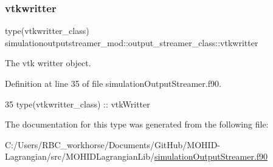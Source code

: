 \subsubsection{\texorpdfstring{vtkwritter}{vtkwritter}}
{\footnotesize\ttfamily type(vtkwritter\+\_\+class) simulationoutputstreamer\+\_\+mod\+::output\+\_\+streamer\+\_\+class\+::vtkwritter\hspace{0.3cm}{\ttfamily [private]}}



The vtk writter object. 



Definition at line 35 of file simulation\+Output\+Streamer.\+f90.


\begin{DoxyCode}
35         \textcolor{keywordtype}{type}(vtkwritter\_class) :: vtkWritter
\end{DoxyCode}


The documentation for this type was generated from the following file\+:\begin{DoxyCompactItemize}
\item 
C\+:/\+Users/\+R\+B\+C\+\_\+workhorse/\+Documents/\+Git\+Hub/\+M\+O\+H\+I\+D-\/\+Lagrangian/src/\+M\+O\+H\+I\+D\+Lagrangian\+Lib/\mbox{\hyperlink{simulation_output_streamer_8f90}{simulation\+Output\+Streamer.\+f90}}\end{DoxyCompactItemize}
